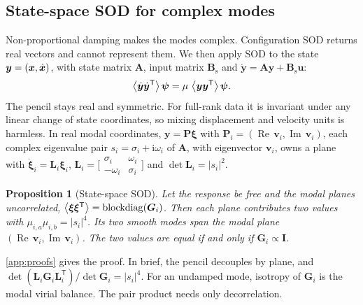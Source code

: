 \documentclass[preprint,12pt]{elsarticle}
\newtheorem{proposition}{Proposition}
\begin{document}
\subsection{State-space SOD for complex modes}\label{sec:ssod}
Non-proportional damping makes the modes complex. Configuration SOD returns real vectors and cannot represent them.
We then apply SOD to the state $\bm{y}=(\bm{x},\dot{\bm{x}})$, with state matrix $\bm{A}$, input matrix $\bm{B}_{\mathrm s}$ and $\dot{\bm{y}}=\bm{A}\bm{y}+\bm{B}_{\mathrm s}\bm{u}$:
\begin{equation}
\left\langle \dot{\bm{y}}\dot{\bm{y}}^{\mathsf T} \right\rangle\bm{\psi}=\mu\,\left\langle \bm{y}\bm{y}^{\mathsf T} \right\rangle\bm{\psi}.
\label{eq:ssod}
\end{equation}
The pencil stays real and symmetric. For full-rank data it is invariant under any linear change of state coordinates, so mixing displacement and velocity units is harmless.
In real modal coordinates, $\bm{y}=\bm{P}\bm{\xi}$ with $\bm{P}_i=(\operatorname{Re}\,\bm{v}_i,\operatorname{Im}\,\bm{v}_i)$, each complex eigenvalue pair $s_i=\sigma_i+\mathrm i\omega_i$ of $\bm{A}$, with eigenvector $\bm{v}_i$, owns a plane with $\dot{\bm{\xi}}_i=\bm{L}_i\bm{\xi}_i$, $\bm{L}_i=\big[\begin{smallmatrix}\sigma_i&\omega_i\\-\omega_i&\sigma_i\end{smallmatrix}\big]$ and $\det\bm{L}_i=|s_i|^2$.

\begin{proposition}[State-space SOD]\label{prop:ssod}
Let the response be free and the modal planes uncorrelated, $\left\langle \bm{\xi}\bm{\xi}^{\mathsf T} \right\rangle=\operatorname{blockdiag}(\bm{G}_i)$. Then each plane contributes two values with $\mu_{i,a}\mu_{i,b}=|s_i|^4$. Its two smooth modes span the modal plane $(\operatorname{Re}\,\bm{v}_i,\operatorname{Im}\,\bm{v}_i)$. The two values are equal if and only if $\bm{G}_i\propto\bm{I}$.
\end{proposition}
\noindent \ref{app:proofs} gives the proof. In brief, the pencil decouples by plane, and $\det(\bm{L}_i\bm{G}_i\bm{L}_i^{\mathsf T})/\det\bm{G}_i=|s_i|^4$.
For an undamped mode, isotropy of $\bm{G}_i$ is the modal virial balance. The pair product needs only decorrelation.
\end{document}
